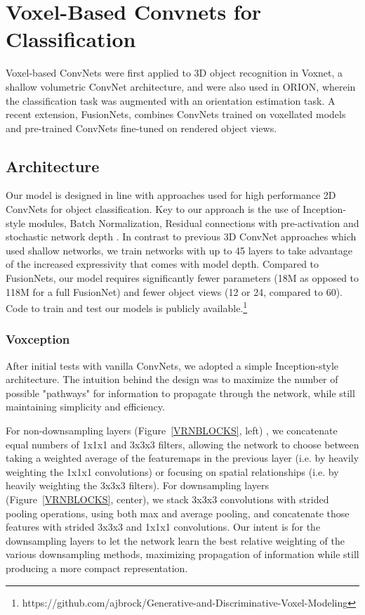 \documentclass{article}
\begin{document}
\section{Voxel-Based Convnets for Classification}
\label{CLASSIFICATION}
Voxel-based ConvNets were first applied to 3D object recognition in Voxnet\citep{VoxNet}, a shallow volumetric ConvNet architecture, and were also used in ORION\citep{ORION}, wherein the classification task was augmented with an orientation estimation task. A recent extension, FusionNets\citep{FusionNets}, combines ConvNets trained on voxellated models and pre-trained ConvNets fine-tuned on rendered object views.

\subsection{Architecture}
Our model is designed in line with approaches used for high performance 2D ConvNets for object classification. Key to our approach is the use of Inception-style modules\citep{Inception}, Batch Normalization\citep{Bnorm}, Residual connections with pre-activation \citep{ResNet}\citep{PreActivation} and stochastic network depth \citep{StochasticDepth}. In contrast to previous 3D ConvNet approaches which used shallow networks, we train networks with up to 45 layers to take advantage of the increased expressivity that comes with model depth. Compared to FusionNets\citep{FusionNets}, our model requires significantly fewer parameters (18M as opposed to 118M for a full FusionNet) and fewer object views (12 or 24, compared to 60). Code to train and test our models is publicly available.\footnote{https://github.com/ajbrock/Generative-and-Discriminative-Voxel-Modeling}


\subsubsection{Voxception}
After initial tests with vanilla ConvNets, we adopted a simple Inception-style architecture. The intuition behind the design was to maximize the number of possible "pathways" for information to propagate through the network, while still maintaining simplicity and efficiency. 

For non-downsampling layers (Figure~\ref{VRNBLOCKS}, left) , we concatenate equal numbers of 1x1x1 and 3x3x3 filters, allowing the network to choose between taking a weighted average of the featuremaps in the previous layer (i.e. by heavily weighting the 1x1x1 convolutions) or focusing on spatial relationships (i.e. by heavily weighting the 3x3x3 filters). For downsampling layers (Figure~\ref{VRNBLOCKS}, center), we stack 3x3x3 convolutions with strided pooling operations, using both max and average pooling, and concatenate those features with strided 3x3x3 and 1x1x1 convolutions. Our intent is for the downsampling layers to let the network learn the best relative weighting of the various downsampling methods, maximizing propagation of information while still producing a more compact representation.
\end{document}
